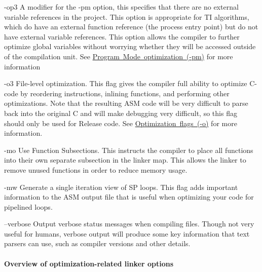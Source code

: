\begin{DoxyItemize}
\item {\ttfamily -\/op3}  A modifier for the -\/pm option, this specifies that there are no external variable references in the project. This option is appropriate for TI algorithms, which do have an external function reference (the process entry point) but do not have external variable references. This option allows the compiler to further optimize global variables without worrying whether they will be accessed outside of the compilation unit. See \mbox{\hyperlink{a00832_subsubsection__program_mode_optimization_pm_}{Program Mode optimization (-\/pm)}} for more information  


\item {\ttfamily -\/o3}  File-\/level optimization. This flag gives the compiler full ability to optimize C-\/code by reordering instructions, inlining functions, and performing other optimizations. Note that the resulting A\+SM code will be very difficult to parse back into the original C and will make debugging very difficult, so this flag should only be used for Release code. See \mbox{\hyperlink{a00832_subsubsection__optimization_flags_o_}{Optimization flags (-\/o)}} for more information.  


\item {\ttfamily -\/mo}  Use Function Subsections. This instructs the compiler to place all functions into their own separate subsection in the linker map. This allows the linker to remove unused functions in order to reduce memory usage.  


\item {\ttfamily -\/mw}  Generate a single iteration view of SP loops. This flag adds important information to the A\+SM output file that is useful when optimizing your code for pipelined loops.  


\item {\ttfamily –verbose}  Output verbose status messages when compiling files. Though not very useful for humans, verbose output will produce some key information that text parsers can use, such as compiler versions and other details.  


\end{DoxyItemize}

\hypertarget{a00832_subsubsection__overview_of_optimizationrelated_linker_options_}{}\paragraph{Overview of optimization-\/related linker options}\label{a00832_subsubsection__overview_of_optimizationrelated_linker_options_}
 

